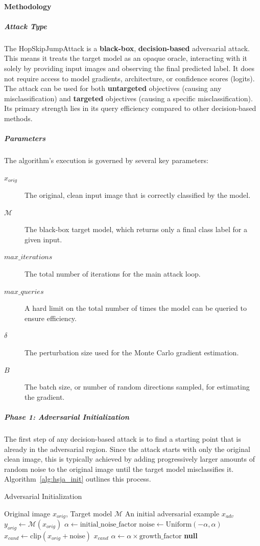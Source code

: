 \documentclass[../main.tex]{subfiles}
\begin{document}
\paragraph{Methodology}

\subparagraph{Attack Type}
The HopSkipJumpAttack is a \textbf{black-box}, \textbf{decision-based} adversarial attack. This means it treats the target model as an opaque oracle, interacting with it solely by providing input images and observing the final predicted label. It does not require access to model gradients, architecture, or confidence scores (logits). The attack can be used for both \textbf{untargeted} objectives (causing any misclassification) and \textbf{targeted} objectives (causing a specific misclassification). Its primary strength lies in its query efficiency compared to other decision-based methods.

\subparagraph{Parameters}
The algorithm's execution is governed by several key parameters:
\begin{description}
  \item[$x_{orig}$] The original, clean input image that is correctly classified by the model.
  \item[$\mathcal{M}$] The black-box target model, which returns only a final class label for a given input.
  \item[$max\_iterations$] The total number of iterations for the main attack loop.
  \item[$max\_queries$] A hard limit on the total number of times the model can be queried to ensure efficiency.
  \item[$\delta$] The perturbation size used for the Monte Carlo gradient estimation.
  \item[$B$] The batch size, or number of random directions sampled, for estimating the gradient.
\end{description}

\subparagraph{Phase 1: Adversarial Initialization}
The first step of any decision-based attack is to find a starting point that is already in the adversarial region. Since the attack starts with only the original clean image, this is typically achieved by adding progressively larger amounts of random noise to the original image until the target model misclassifies it. Algorithm~\ref{alg:hsja_init} outlines this process.

\begin{breakablealgorithm}{Adversarial Initialization}
\label{alg:hsja_init}
\begin{algorithmic}[1]
\Require Original image $x_{orig}$, Target model $\mathcal{M}$
\Ensure An initial adversarial example $x_{adv}$
\State $y_{orig} \gets \mathcal{M}(x_{orig})$
\State $\alpha \gets \text{initial\_noise\_factor}$
    \State $\text{noise} \gets \text{Uniform}(-\alpha, \alpha)$
    \State $x_{cand} \gets \text{clip}(x_{orig} + \text{noise})$
        \State \Return $x_{cand}$
    \EndIf
    \State $\alpha \gets \alpha \times \text{growth\_factor}$
\EndFor
\State \Return \textbf{null}
\end{algorithmic}
\end{breakablealgorithm}
\end{document}

